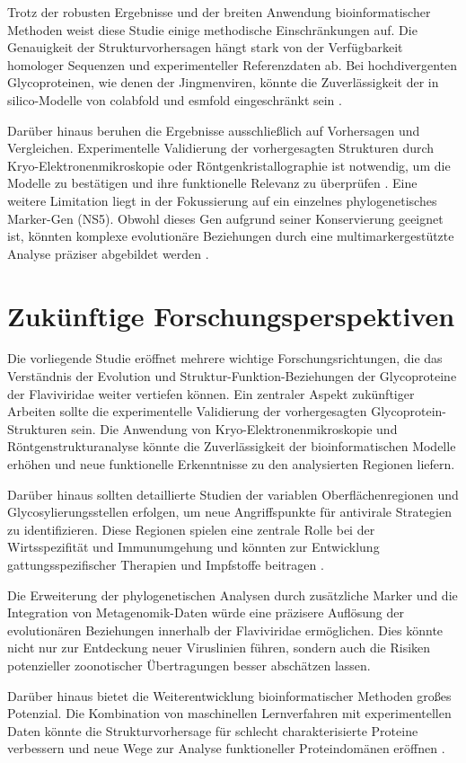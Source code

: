 Trotz der robusten Ergebnisse und der breiten Anwendung bioinformatischer Methoden weist diese Studie einige methodische Einschränkungen auf. Die Genauigkeit der Strukturvorhersagen hängt stark von der Verfügbarkeit homologer Sequenzen und experimenteller Referenzdaten ab. Bei hochdivergenten Glycoproteinen, wie denen der Jingmenviren, könnte die Zuverlässigkeit der in silico-Modelle von \gls{colabfold} und \gls{esmfold} eingeschränkt sein \autocite{Jumper2021}.

Darüber hinaus beruhen die Ergebnisse ausschließlich auf Vorhersagen und Vergleichen. Experimentelle Validierung der vorhergesagten Strukturen durch Kryo-Elektronenmikroskopie oder Röntgenkristallographie ist notwendig, um die Modelle zu bestätigen und ihre funktionelle Relevanz zu überprüfen \autocite{Callaway2020}. Eine weitere Limitation liegt in der Fokussierung auf ein einzelnes phylogenetisches Marker-Gen (NS5). Obwohl dieses Gen aufgrund seiner Konservierung geeignet ist, könnten komplexe evolutionäre Beziehungen durch eine multimarkergestützte Analyse präziser abgebildet werden \autocite{Felsenstein1985}.

\section{Zukünftige Forschungsperspektiven} \label{sec:zukuenftige-forschungsperspektiven}

Die vorliegende Studie eröffnet mehrere wichtige Forschungsrichtungen, die das Verständnis der Evolution und Struktur-Funktion-Beziehungen der Glycoproteine der Flaviviridae weiter vertiefen können. Ein zentraler Aspekt zukünftiger Arbeiten sollte die experimentelle Validierung der vorhergesagten Glycoprotein-Strukturen sein. Die Anwendung von Kryo-Elektronenmikroskopie und Röntgenstrukturanalyse könnte die Zuverlässigkeit der bioinformatischen Modelle erhöhen und neue funktionelle Erkenntnisse zu den analysierten Regionen liefern.

Darüber hinaus sollten detaillierte Studien der variablen Oberflächenregionen und Glycosylierungsstellen erfolgen, um neue Angriffspunkte für antivirale Strategien zu identifizieren. Diese Regionen spielen eine zentrale Rolle bei der Wirtsspezifität und Immunumgehung und könnten zur Entwicklung gattungsspezifischer Therapien und Impfstoffe beitragen \autocite{Fernandez2018}.

Die Erweiterung der phylogenetischen Analysen durch zusätzliche Marker und die Integration von Metagenomik-Daten würde eine präzisere Auflösung der evolutionären Beziehungen innerhalb der Flaviviridae ermöglichen. Dies könnte nicht nur zur Entdeckung neuer Viruslinien führen, sondern auch die Risiken potenzieller zoonotischer Übertragungen besser abschätzen lassen.

Darüber hinaus bietet die Weiterentwicklung bioinformatischer Methoden großes Potenzial. Die Kombination von maschinellen Lernverfahren mit experimentellen Daten könnte die Strukturvorhersage für schlecht charakterisierte Proteine verbessern und neue Wege zur Analyse funktioneller Proteindomänen eröffnen \autocite{Senior2020}.